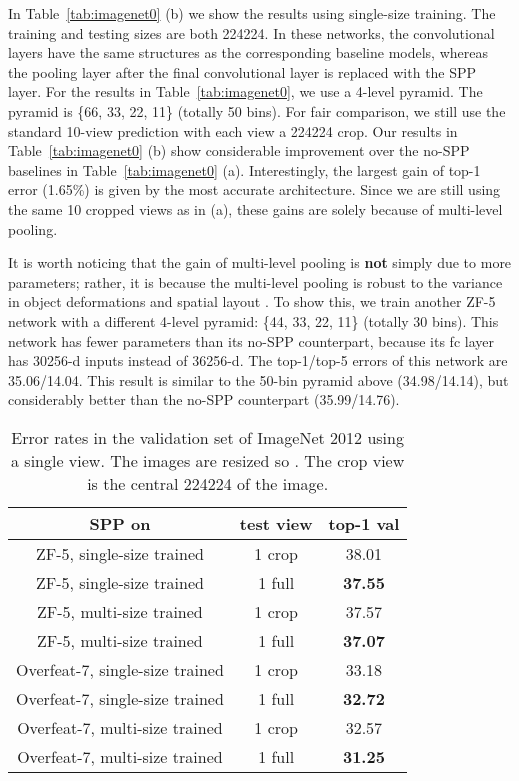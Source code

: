 \documentclass[10pt,journal,cspaper,compsoc]{IEEEtran}
\begin{document}
In Table~\ref{tab:imagenet0} (b) we show the results using single-size training. The training and testing sizes are both 224224. In these networks, the convolutional layers have the same structures as the corresponding baseline models, whereas the pooling layer after the final convolutional layer is replaced with the SPP layer. For the results in Table~\ref{tab:imagenet0}, we use a 4-level pyramid. The pyramid is \{66, 33,  22, 11\} (totally 50 bins). For fair comparison, we still use the standard 10-view prediction with each view a 224224 crop.
Our results in Table~\ref{tab:imagenet0} (b) show considerable improvement over the no-SPP baselines in Table~\ref{tab:imagenet0} (a). Interestingly, the largest gain of top-1 error (1.65\%) is given by the most accurate architecture. Since we are still using the same 10 cropped views as in (a), these gains are solely because of multi-level pooling.

It is worth noticing that the gain of multi-level pooling is \textbf{not} simply due to more parameters; rather, it is because the multi-level pooling is robust to the variance in object deformations and spatial layout \cite{Lazebnik2006}. To show this, we train another ZF-5 network with a different 4-level pyramid: \{44, 33,  22, 11\} (totally 30 bins). This network has fewer parameters than its no-SPP counterpart, because its fc layer has 30256-d inputs instead of 36256-d. The top-1/top-5 errors of this network are 35.06/14.04. This result is similar to the 50-bin pyramid above (34.98/14.14), but considerably better than the no-SPP counterpart (35.99/14.76).

\setlength{\tabcolsep}{3pt}
\begin{table}[t]
\footnotesize
\begin{center}
\begin{tabular}{c|c|c}
\hline
 SPP on & test view & top-1 val \\
\hline
ZF-5, single-size trained & 1 crop & 38.01\\
ZF-5, single-size trained & 1 full & \textbf{37.55}\\
\hline
ZF-5, multi-size trained & 1 crop & 37.57\\
ZF-5, multi-size trained & 1 full & \textbf{37.07}\\
\hline
\hline
Overfeat-7, single-size trained & 1 crop & 33.18\\
Overfeat-7, single-size trained & 1 full & \textbf{32.72}\\
\hline
Overfeat-7, multi-size trained & 1 crop & 32.57\\
Overfeat-7, multi-size trained & 1 full & \textbf{31.25}\\
\hline
\end{tabular}
\end{center}
\caption{Error rates in the validation set of ImageNet 2012 using a single view. The images are resized so . The crop view is the central 224224 of the image.}
\label{tab:imagenet_fullview}
\end{table}
\end{document}
